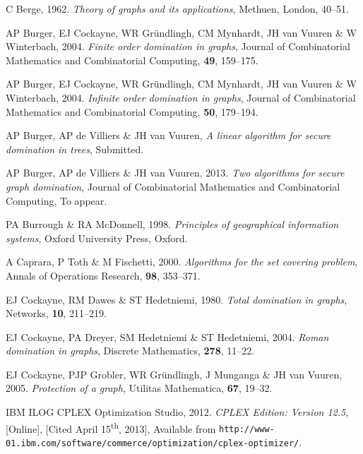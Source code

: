 \documentclass[10pt,a4paper]{article}
\begin{document}
{\footnotesize

\begin{thebibliography}{10}

 {\sc C Berge}, 1962. {\em Theory of graphs and its applications}, Methuen, London, 40--51.
 
 {\sc AP Burger, EJ Cockayne, WR Gr\"undlingh, CM Mynhardt, JH van Vuuren \& W Winterbach}, 2004. {\em Finite order domination in graphs}, Journal of Combinatorial Mathematics and Combinatorial Computing, {\bf 49}, 159--175.
 
 {\sc AP Burger, EJ Cockayne, WR Gr\"undlingh, CM Mynhardt, JH van Vuuren \& W Winterbach}, 2004. {\em Infinite order domination in graphs}, Journal of Combinatorial Mathematics and Combinatorial Computing, {\bf 50}, 179--194.
 
 {\sc AP Burger, AP de Villiers \& JH van Vuuren}, {\em A linear algorithm for secure domination in trees}, Submitted.
 
 {\sc AP Burger, AP de Villiers \& JH van Vuuren}, 2013. {\em Two algorithms for secure graph domination}, Journal of Combinatorial Mathematics and Combinatorial Computing, To appear.

 {\sc PA Burrough \& RA McDonnell}, 1998. {\em Principles of geographical information systems}, Oxford University Press, Oxford.


 {\sc A Caprara, P Toth \& M Fischetti}, 2000. {\em Algorithms for the set covering problem}, Annals of Operations Research, {\bf 98}, 353--371. 
 
 {\sc EJ Cockayne, RM Dawes \& ST Hedetniemi}, 1980. {\em Total domination in graphs}, Networks, {\bf 10}, 211--219.
 
 {\sc EJ Cockayne, PA Dreyer, SM Hedetniemi \& ST Hedetniemi}, 2004. {\em Roman domination in graphs}, Discrete Mathematics, {\bf 278}, 11--22.
 
 {\sc EJ Cockayne, PJP Grobler, WR Gr\"undlingh, J Munganga \& JH van Vuuren}, 2005. {\em Protection of a graph}, Utilitas Mathematica, {\bf 67}, 19--32.

 {\sc IBM ILOG CPLEX Optimization Studio}, 2012. {\em CPLEX Edition: Version 12.5}, [Online], [Cited April 15\textsuperscript{th}, 2013], Available from {\tt http://www-01.ibm.com/software/commerce/optimization/cplex-optimizer/}.
 

\end{thebibliography}}
\end{document}
